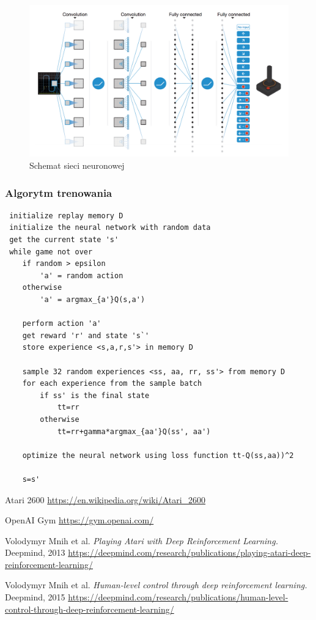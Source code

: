 \documentclass[12pt]{article}
\begin{document}
\begin{figure}[H]
\centering \includegraphics[scale=0.3]{network.png}
\caption{Schemat sieci neuronowej \cite{deepmind_2}}
\label{simple1}
\end{figure}

\newpage

\subsubsection{Algorytm trenowania}

\begin{lstlisting}
 initialize replay memory D
 initialize the neural network with random data
 get the current state 's'
 while game not over
 	if random > epsilon 
 		'a' = random action
 	otherwise
 		'a' = argmax_{a'}Q(s,a')

	perform action 'a'
	get reward 'r' and state 's`'
	store experience <s,a,r,s'> in memory D
	
	sample 32 random experiences <ss, aa, rr, ss'> from memory D
	for each experience from the sample batch
		if ss' is the final state 
			tt=rr
		otherwise
			tt=rr+gamma*argmax_{aa'}Q(ss', aa')
	
	optimize the neural network using loss function tt-Q(ss,aa))^2
	
	s=s'
\end{lstlisting}

\newpage

\begin{thebibliography}{9}

  Atari 2600 \url{https://en.wikipedia.org/wiki/Atari_2600}

  OpenAI Gym \url{https://gym.openai.com/}


  Volodymyr Mnih et al. 
\textit{Playing Atari with Deep Reinforcement Learning.} Deepmind, 2013
   \url{https://deepmind.com/research/publications/playing-atari-deep-reinforcement-learning/}

  Volodymyr Mnih et al. 
\textit{Human-level control through deep reinforcement learning.} Deepmind, 2015
   \url{https://deepmind.com/research/publications/human-level-control-through-deep-reinforcement-learning/}


\end{thebibliography}
\end{document}
